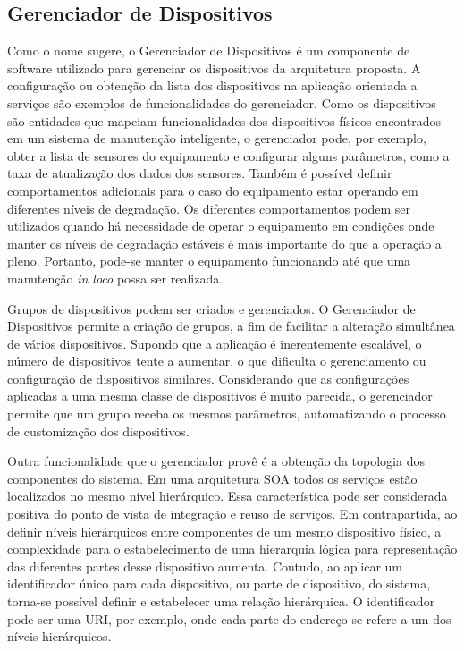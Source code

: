 \subsection{Gerenciador de Dispositivos}
\label{sub:proposta-gerenciador-dispositivos}

Como o nome sugere, o Gerenciador de Dispositivos é um componente de software utilizado para
gerenciar os dispositivos da arquitetura proposta. A configuração ou obtenção da lista dos
dispositivos na aplicação orientada a serviços são exemplos de funcionalidades do gerenciador. Como
os dispositivos são entidades que mapeiam funcionalidades dos dispositivos físicos encontrados em um
sistema de manutenção inteligente, o gerenciador pode, por exemplo, obter a lista de sensores do
equipamento e configurar alguns parâmetros, como a taxa de atualização dos dados dos sensores.
Também é possível definir comportamentos adicionais para o caso do equipamento estar operando em
diferentes níveis de degradação. Os diferentes comportamentos podem ser utilizados quando há
necessidade de operar o equipamento em condições onde manter os níveis de degradação estáveis é mais
importante do que a operação a pleno. Portanto, pode-se manter o equipamento funcionando até que uma
manutenção \textit{in loco} possa ser realizada.

Grupos de dispositivos podem ser criados e gerenciados. O Gerenciador de Dispositivos permite a
criação de grupos, a fim de facilitar a alteração simultânea de vários dispositivos. Supondo que a
aplicação é inerentemente escalável, o número de dispositivos tente a aumentar, o que dificulta o
gerenciamento ou configuração de dispositivos similares. Considerando que as configurações aplicadas
a uma mesma classe de dispositivos é muito parecida, o gerenciador permite que um grupo receba os
mesmos parâmetros, automatizando o processo de customização dos dispositivos.

Outra funcionalidade que o gerenciador provê é a obtenção da topologia dos componentes do sistema.
Em uma arquitetura \gls{SOA} todos os serviços estão localizados no mesmo nível hierárquico. Essa
característica pode ser considerada positiva do ponto de vista de integração e reuso de serviços. Em
contrapartida, ao definir níveis hierárquicos entre componentes de um mesmo dispositivo físico, a
complexidade para o estabelecimento de uma hierarquia lógica para representação das diferentes
partes desse dispositivo aumenta. Contudo, ao aplicar um identificador único para cada dispositivo,
ou parte de dispositivo, do sistema, torna-se possível definir e estabelecer uma relação
hierárquica. O identificador pode ser uma \gls{URI}, por exemplo, onde cada parte do endereço se
refere a um dos níveis hierárquicos.

